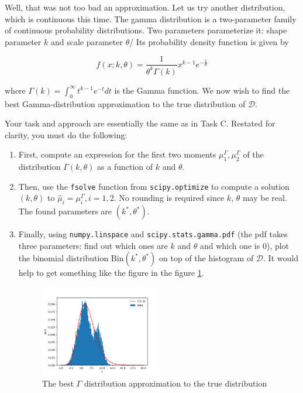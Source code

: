 \begin{tcolorbox}
    Well, that was not too bad an approximation. Let us try another distribution,
    which is continuous this time. The gamma distribution is a two-parameter
    family of continuous probability distributions. Two parameters parameterize
    it: shape parameter $k$ and scale parameter $\theta$/ Its probability density
    function is given by

    \begin{equation*}
        f(x; k, \theta) = \dfrac{1}{\theta^k \Gamma(k)} x^{k - 1} 
        e^{-\frac{x}{\theta}}
    \end{equation*}

    where $\Gamma(k) = \int_{0}^{\infty} t^{k - 1} e^{-t} dt$ is the Gamma
    function. We now wish to find the best Gamma-distribution approximation to the
    true distribution of $\mathcal{D}$.

    Your task and approach are essentially the same as in Task C. Restated for
    clarity, you must do the following:

    \vspace{10pt}
    \begin{enumerate}
        \item First, compute an expression for the first two moments
        $\mu_1^{\Gamma}, \mu_2^{\Gamma}$ of the distribution $\Gamma(k, \theta)$
        as a function of $k$ and $\theta$.
        \item Then, use the \texttt{fsolve} function from \texttt{scipy.optimize}
        to compute a solution $(k, \theta)$ to $\hat{\mu}_i = \mu^{\Gamma}_i, i =
        1, 2$. No rounding is required since $k$, $\theta$ may be real. The found
        parameters are $(k^*, \theta^*)$.
        \item Finally, using \texttt{numpy.linspace} and
        \texttt{scipy.stats.gamma.pdf} (the pdf takes three parameters: find out
        which ones are $k$ and $\theta$ and which one is 0), plot the binomial
        distribution $\text{Bin}(k^*, \theta^*)$ on top of the histogram of
        $\mathcal{D}$. It would help to get something like the figure in the
        figure \ref{fig_q3d}.
    
            \begin{figure}[H]
                \centering
                \includegraphics[width=0.5\textwidth]{assets/images/q3d.png}
                \caption{The best $\Gamma$ distribution approximation to the true
                distribution}
                \label{fig_q3d}
            \end{figure}
    \end{enumerate}
    
\end{tcolorbox}

